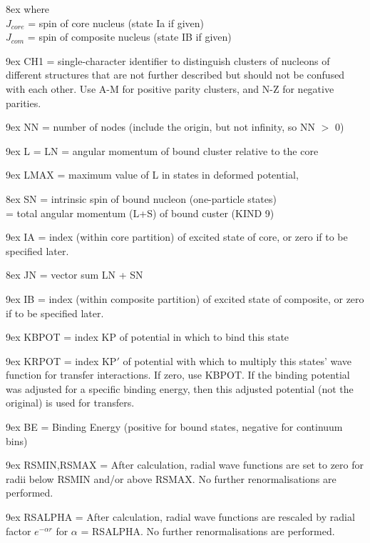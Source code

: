 \documentclass[11pt]{article}
\begin{document}
\hangindent 8ex  where
\\  $J_{core}$ = spin of core nucleus (state Ia if given)
\\  $J_{com}$  = spin of composite nucleus (state IB if given)

\bigskip


\hangindent 9ex
CH1 = single-character identifier to distinguish clusters of
nucleons of different structures that are not further described
but should not be confused with each other.
Use A-M for positive parity clusters, and N-Z for negative parities.

\hangindent 9ex
NN = number of nodes (include the origin, but not infinity, so NN $>$ 0)

\hangindent 9ex
L  = LN = angular momentum of bound cluster relative to the core

\hangindent 9ex
LMAX = maximum value of L in states in deformed potential,

\hangindent 8ex  SN
      = intrinsic spin of bound nucleon (one-particle states)
\\  = total angular momentum (L+S) of bound custer (KIND  9)
      
\hangindent 9ex
IA = index (within core partition) of excited state of core,
or zero if to be specified later.

\hangindent 8ex  JN
     = vector sum LN + SN

\hangindent 9ex
IB = index (within composite partition) of excited state of composite,
or zero if to be specified later.

\hangindent 9ex
KBPOT = index KP of potential in which to bind this state

\hangindent 9ex
KRPOT = index KP$'$ of potential with which to multiply this states'
wave function for transfer interactions. If zero, use KBPOT.
If the binding potential was adjusted for a specific binding
energy, then this adjusted potential (not the original) is used
for transfers.

\hangindent 9ex
BE = Binding Energy (positive for bound states, negative for
continuum bins)

\hangindent 9ex
RSMIN,RSMAX = After calculation, radial wave functions are set to zero for radii below RSMIN and/or above RSMAX. No further renormalisations are performed.

\hangindent 9ex
RSALPHA = After calculation, radial wave functions are rescaled by radial factor $e^{-\alpha  r }$ for $\alpha$ = RSALPHA.  No further renormalisations are performed.
\end{document}
